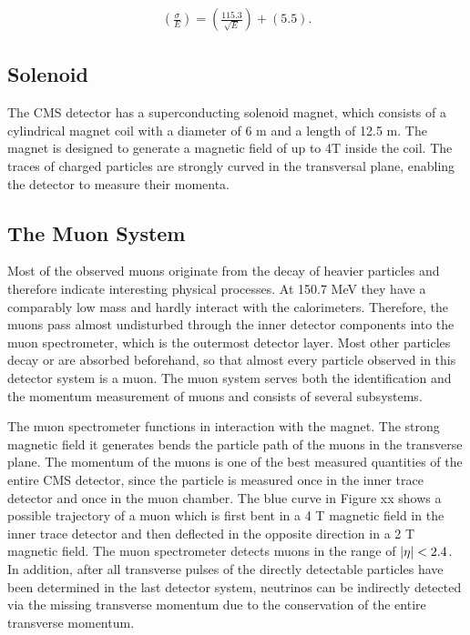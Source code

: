 \documentclass[12pt, a4paper]{thesis}
\begin{document}
\begin{align}
\left( \frac{\sigma}{E} \right) = \left( \frac{115.3}{\sqrt{E}} \right) + (5.5).
\end{align}

\subsection{Solenoid}
\label{sec:org004c39a}
The CMS detector has a superconducting solenoid magnet, which consists of a
cylindrical magnet coil with a diameter of 6 m and a length of 12.5 m.  The
magnet is designed to generate a magnetic field of up to 4T inside the coil. The
traces of charged particles are strongly curved in the transversal plane,
enabling the detector to measure their momenta. 

\subsection{The Muon System}
\label{sec:org643030a}

Most of the observed muons originate from the decay of heavier particles and
therefore indicate interesting physical processes. At 150.7 MeV they have a
comparably low mass and hardly interact with the calorimeters. Therefore, the
muons pass almost undisturbed through the inner detector components into the
muon spectrometer, which is the outermost detector layer. Most other particles
decay or are absorbed beforehand, so that almost every particle observed in this
detector system is a muon. The muon system serves both the identification and
the momentum measurement of muons and consists of several subsystems.

The muon spectrometer functions in interaction with the magnet. The strong
magnetic field it generates bends the particle path of the muons in the
transverse plane. The momentum of the muons is one of the best measured
quantities of the entire CMS detector, since the particle is measured once in
the inner trace detector and once in the muon chamber. The blue curve in Figure
xx shows a possible trajectory of a muon which is first bent in a 4 T magnetic
field in the inner trace detector and then deflected in the opposite direction
in a 2 T magnetic field. The muon spectrometer detects muons in the range of
\(\abs{\eta} < 2.4\). In addition, after all transverse pulses of the directly
detectable particles have been determined in the last detector system, neutrinos
can be indirectly detected via the missing transverse momentum due to the
conservation of the entire transverse momentum. 
\end{document}
